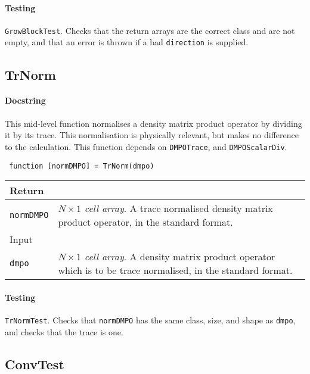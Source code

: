  \paragraph{Testing} \lstinline$GrowBlockTest$. Checks that the return arrays are the correct class and are not empty, and that an error is thrown if a bad \lstinline$direction$ is supplied.
 
 \subsection{TrNorm}
 \paragraph{Docstring} This mid-level function normalises a density matrix product operator by dividing it by its trace. This normalisation is physically relevant, but makes no difference to the calculation. This function depends on \lstinline$DMPOTrace$, and \lstinline$DMPOScalarDiv$.
 \begin{lstlisting}
 function [normDMPO] = TrNorm(dmpo) \end{lstlisting}
 \begin{longtabu}{X[1,l]X[4,l]}
 \hline
 Return & \\ \hline
 \lstinline$normDMPO$ & \emph{\(N \times 1\) cell array}. A trace normalised density matrix product operator, in the standard format. \\ \hline
 Input & \\ \hline
 \lstinline$dmpo$ & \emph{\(N \times 1\) cell array}. A density matrix product operator which is to be trace normalised, in the standard format. \\
 \hline
 \end{longtabu}
 \paragraph{Testing} \lstinline$TrNormTest$. Checks that \lstinline$normDMPO$ has the same class, size, and shape as \lstinline$dmpo$, and checks that the trace is one.
 
 \subsection{ConvTest}
